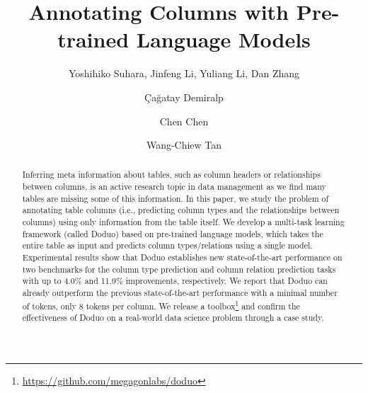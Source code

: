 \documentclass[sigconf]{acmart}
\newcommand{\name}{\mbox{\sc Doduo}}
\newcommand{\hll}[1]{#1}
\newcommand{\revcr}[1]{#1}
\begin{document}
\title{Annotating Columns with Pre-trained Language Models}



\author{Yoshihiko Suhara, Jinfeng Li, Yuliang Li, Dan Zhang}

\author{\c{C}a\u{g}atay Demiralp}


\author{Chen Chen}

\author{Wang-Chiew Tan}\authornotemark[1]



\begin{abstract}
Inferring meta information about tables, such as column headers or relationships between columns, is an active
research topic in data management as we find many tables are missing some of this information.
%
In this paper, we study the problem of annotating table columns (i.e., predicting column types and the relationships between columns) using only information from the table itself. 
%
\hll{We develop a multi-task learning framework (called \name) based on pre-trained language models, which takes the entire table as input and predicts column types/relations using a single model.}
%
Experimental results show that \name{} establishes new state-of-the-art performance on two benchmarks for the column type prediction and column relation prediction tasks with up to 4.0\% and 11.9\% improvements, respectively. We report that \name{} can already outperform the previous state-of-the-art performance with a minimal number of tokens, only 8 tokens per column. 
%
\hll{We release a toolbox\footnote{\revcr{\url{https://github.com/megagonlabs/doduo}}}
and confirm the effectiveness of \name{} on a real-world data science problem through a case study.}
\end{abstract}

\maketitle
\end{document}
